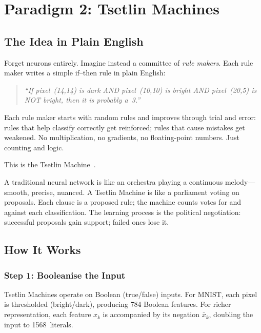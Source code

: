 \section{Paradigm 2: Tsetlin Machines}
\label{sec:tsetlin}

\subsection{The Idea in Plain English}

Forget neurons entirely. Imagine instead a committee of \emph{rule
makers}. Each rule maker writes a simple if--then rule in plain
English:

\begin{quote}
\emph{``If pixel~(14,14) is dark AND pixel~(10,10) is bright AND
pixel~(20,5) is NOT bright, then it is probably a~3.''}
\end{quote}

Each rule maker starts with random rules and improves through
trial and error: rules that help classify correctly get reinforced;
rules that cause mistakes get weakened. No multiplication, no
gradients, no floating-point numbers. Just counting and logic.

This is the Tsetlin Machine~\cite{granmo2018tsetlin}.

\begin{analogy}
A traditional neural network is like an orchestra playing a
continuous melody---smooth, precise, nuanced. A Tsetlin Machine
is like a parliament voting on proposals. Each clause is a proposed
rule; the machine counts votes for and against each classification.
The learning process is the political negotiation: successful
proposals gain support; failed ones lose it.
\end{analogy}

\subsection{How It Works}

\subsubsection{Step 1: Booleanise the Input}

Tsetlin Machines operate on Boolean (true/false) inputs. For MNIST,
each pixel is thresholded (bright/dark), producing 784 Boolean
features. For richer representation, each feature $x_k$ is
accompanied by its negation $\bar{x}_k$, doubling the input to
1568~literals.

